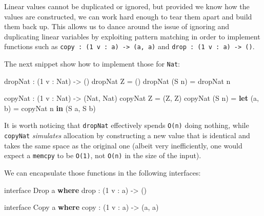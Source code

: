 \documentclass[
]{article}
\newenvironment{Shaded}{}{}
\newcommand{\DataTypeTok}[1]{\textcolor[rgb]{0.56,0.13,0.00}{#1}}
\newcommand{\DecValTok}[1]{\textcolor[rgb]{0.25,0.63,0.44}{#1}}
\newcommand{\FunctionTok}[1]{\textcolor[rgb]{0.02,0.16,0.49}{#1}}
\newcommand{\KeywordTok}[1]{\textcolor[rgb]{0.00,0.44,0.13}{\textbf{#1}}}
\newcommand{\NormalTok}[1]{#1}
\newcommand{\OperatorTok}[1]{\textcolor[rgb]{0.40,0.40,0.40}{#1}}
\newcommand{\OtherTok}[1]{\textcolor[rgb]{0.00,0.44,0.13}{#1}}
\begin{document}
Linear values cannot be duplicated or ignored, but provided we know how
the values are constructed, we can work hard enough to tear them apart
and build them back up. This allows us to dance around the issue of
ignoring and duplicating linear variables by exploiting pattern matching
in order to implement functions such as
\texttt{copy\ :\ (1\ v\ :\ a)\ \textasciigrave{}-\textgreater{}\ (a,\ a)}
and \texttt{drop\ :\ (1\ v\ :\ a)\ -\textgreater{}\ ()}.

The next snippet show how to implement those for \texttt{Nat}:

\begin{Shaded}
\begin{Highlighting}[]
\NormalTok{dropNat }\OperatorTok{:}\NormalTok{ (}\DecValTok{1}\NormalTok{ v }\OperatorTok{:} \DataTypeTok{Nat}\NormalTok{) }\OtherTok{{-}\textgreater{}}\NormalTok{ ()}
\NormalTok{dropNat }\DataTypeTok{Z} \OtherTok{=}\NormalTok{ ()}
\NormalTok{dropNat (}\DataTypeTok{S}\NormalTok{ n) }\OtherTok{=}\NormalTok{ dropNat n}

\NormalTok{copyNat }\OperatorTok{:}\NormalTok{ (}\DecValTok{1}\NormalTok{ v }\OperatorTok{:} \DataTypeTok{Nat}\NormalTok{) }\OtherTok{{-}\textgreater{}}\NormalTok{ (}\DataTypeTok{Nat}\NormalTok{, }\DataTypeTok{Nat}\NormalTok{)}
\NormalTok{copyNat }\DataTypeTok{Z} \OtherTok{=}\NormalTok{ (}\DataTypeTok{Z}\NormalTok{, }\DataTypeTok{Z}\NormalTok{)}
\NormalTok{copyNat (}\DataTypeTok{S}\NormalTok{ n) }\OtherTok{=} \KeywordTok{let}\NormalTok{ (a, b) }\OtherTok{=}\NormalTok{ copyNat n }\KeywordTok{in}
\NormalTok{                    (}\DataTypeTok{S}\NormalTok{ a, }\DataTypeTok{S}\NormalTok{ b)}
\end{Highlighting}
\end{Shaded}

It is worth noticing that \texttt{dropNat} effectively spends
\texttt{O(n)} doing nothing, while \texttt{copyNat} \emph{simulates}
allocation by constructing a new value that is identical and takes the
same space as the original one (albeit very inefficiently, one would
expect a \texttt{memcpy} to be \texttt{O(1)}, not \texttt{O(n)} in the
size of the input).

We can encapsulate those functions in the following interfaces:

\begin{Shaded}
\begin{Highlighting}[]
\NormalTok{interface }\DataTypeTok{Drop}\NormalTok{ a }\KeywordTok{where}
    \FunctionTok{drop} \OperatorTok{:}\NormalTok{ (}\DecValTok{1}\NormalTok{ v }\OperatorTok{:}\NormalTok{ a) }\OtherTok{{-}\textgreater{}}\NormalTok{ ()}

\NormalTok{interface }\DataTypeTok{Copy}\NormalTok{ a }\KeywordTok{where}
\NormalTok{    copy }\OperatorTok{:}\NormalTok{ (}\DecValTok{1}\NormalTok{ v }\OperatorTok{:}\NormalTok{ a) }\OtherTok{{-}\textgreater{}}\NormalTok{ (a, a)}
\end{Highlighting}
\end{Shaded}
\end{document}
